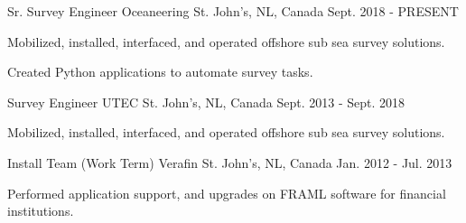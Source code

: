


\begin{cventries}


\cventry
{Sr. Survey Engineer} %
{Oceaneering} %
{St. John's, NL, Canada} %
{Sept. 2018 - PRESENT} %
{ %
\begin{cvitems}
\item { Mobilized, installed, interfaced, and operated offshore sub sea survey solutions.}
\item {Created Python applications to automate survey tasks.}
\end{cvitems}
}


\cventry
{Survey Engineer} %
{UTEC} %
{St. John's, NL, Canada} %
{Sept. 2013 - Sept. 2018} %
{ %
\begin{cvitems}
\item { Mobilized, installed, interfaced, and operated offshore sub sea survey solutions.}
\end{cvitems}
}


\cventry
{Install Team (Work Term)} %
{Verafin} %
{St. John's, NL, Canada} %
{Jan. 2012 - Jul. 2013} %
{ %
\begin{cvitems}
\item {Performed application support, and upgrades on FRAML software for financial institutions.}
\end{cvitems}
}


\end{cventries}